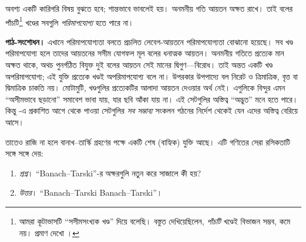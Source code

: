 \documentclass[../../../include/open-logic-section]{subfiles}
\begin{document}
অবশ্য একটি কারিগরি বিষয় বুঝতে হবে;
শান্তভাবে ভাবলেই হয়। অনমনীয় গতি আয়তন
অক্ষত রাখে। তাই বলের পাঁচটি\footnote{আমরা
কূটাভাসটি ``সসীমসংখ্যক খণ্ড'' দিয়ে বলেছি।
বস্তুত \citet{Robinson1947} দেখিয়েছিলেন,
\emph{পাঁচটি} খণ্ডেই বিভাজন সম্ভব, কমে নয়।
প্রমাণ দেখো \citet[pp.~66--7]{Wagon2016}।}
খণ্ডের সবগুলি \emph{পরিমাপযোগ্য} হতে পারে না।
\par\noindent\textbf{পাঠ-সংশোধন।} এখানে পরিমাপযোগ্যতা বলতে প্রচলিত লেবেগ-আয়তনে পরিমাপযোগ্যতা
বোঝানো হয়েছে। সব খণ্ড পরিমাপযোগ্য হলে তাদের আয়তনের
সসীম যোগফল মূল বলের ধনাত্মক আয়তন। অনমনীয় গতিতে প্রত্যেক
মান অক্ষত থাকে, অথচ পুনর্গঠিত বিযুক্ত দুই বলের আয়তন সেই
মানের দ্বিগুণ—বিরোধ। তাই অন্তত একটি খণ্ড অপরিমাপযোগ্য;
এই যুক্তি প্রত্যেক খণ্ডই অপরিমাপযোগ্য বলে না। উপরকার
উপপাদ্যে বল নিরেট ও ত্রিমাত্রিক, বৃত্ত বা দ্বিমাত্রিক চাকতি নয়।
মোটামুটি, খণ্ডগুলির প্রত্যেকটির আলাদা আয়তন
দেওয়ার অর্থ নেই। এগুলিকে বিন্দুর এমন
``অসীমভাবে ছড়ানো'' সমাবেশ ভাবা যায়,
যার ছবি আঁকা যায় না। এই সেটগুলির অস্তিত্ব
``অদ্ভুত'' মনে হতে পারে। কিন্তু \stagesacc{}-এ
প্রকাশিত আগে থেকে পাওয়া সেটগুলির \emph{সব
সম্ভাব্য} সংকলন গঠনের নির্দেশ থেকেই যেন
এদের অস্তিত্ব বেরিয়ে আসে।

তাতেও রাজি না হলে বানাখ--তার্স্কি গ্রহণের
পক্ষে একটি শেষ (বাহ্যিক) যুক্তি আছে। এটি
গণিতের সেরা রসিকতাটি সঙ্গে সঙ্গে দেয়:
\begin{enumerate}
	\item[] \emph{প্রশ্ন}। ``Banach--Tarski''-র
	অক্ষরগুলি নতুন করে সাজালে কী হয়?
	\item[] \emph{উত্তর}। ``Banach--Tarski Banach--Tarski''।
\end{enumerate}
\end{document}
